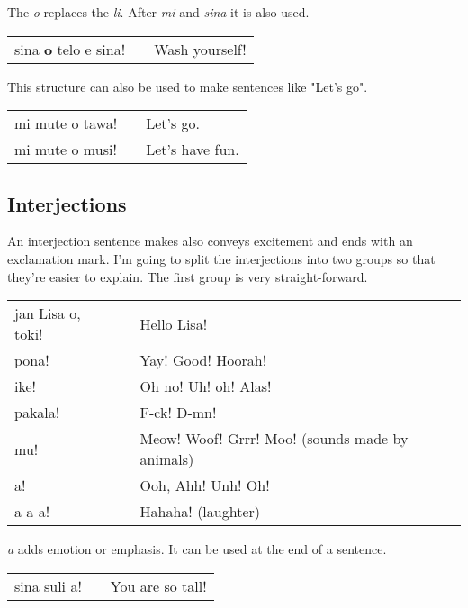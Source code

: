 The \textit{o} replaces the \textit{li}. After \textit{mi}  and \textit{sina} it is also used.

\begin{supertabular}{p{5,5cm}|ll}
sina \textbf{o} telo e sina! && Wash yourself! \\
\end{supertabular} 

This structure can also be used to make sentences like "Let's go".

\begin{supertabular}{p{5,5cm}|ll}
mi mute o tawa! && Let's go. \\
mi mute o musi! && Let's have fun. \\
\end{supertabular} 
%
{}
\subsection*{Interjections}
%
An interjection sentence makes also conveys excitement and ends with an exclamation mark.
I'm going to split the interjections into two groups so that they're easier to explain. 
The first group is very straight-forward.

\begin{supertabular}{p{5,5cm}|ll}
jan Lisa o, toki! && Hello Lisa! \\
pona! && Yay! Good! Hoorah! \\
ike! && Oh no! Uh! oh! Alas! \\
pakala! && F-ck! D-mn! \\
mu! && Meow! Woof! Grrr! Moo! (sounds made by animals) \\
a! && Ooh, Ahh! Unh! Oh! \\
a a a! && Hahaha! (laughter) \\
\end{supertabular} 

\textit{a} adds emotion or emphasis. It can be used at the end of a sentence.

\begin{supertabular}{p{5,5cm}|ll}
sina suli a! && You are so tall! \\
\end{supertabular} 

